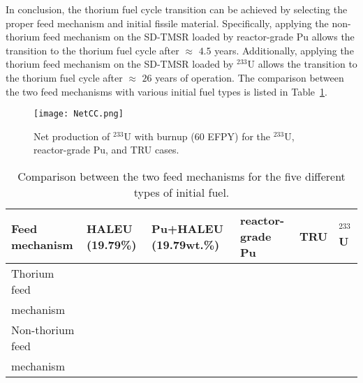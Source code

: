 In conclusion, the thorium fuel cycle transition can be achieved by selecting the 
proper feed mechanism and initial fissile material. 
Specifically, applying the non-thorium feed mechanism on 
the SD-TMSR loaded by reactor-grade Pu allows the 
transition to the thorium fuel cycle after $\approx$ 
$4.5$ years. Additionally, applying the thorium feed mechanism on 
the SD-TMSR loaded by $^{233}$U allows the 
transition to the thorium fuel cycle after $\approx$ $26$ years of operation. 
The comparison between the two feed mechanisms with various initial fuel types 
is listed in Table~\ref{tab:comp_feeds}. 

\begin{figure}
	\centering
	\texttt{[image: NetCC.png]}
	\caption{Net production of $^{233}$U with burnup (60 \gls{EFPY}) for the $^{233}$U, reactor-grade Pu, and TRU cases.}
	\label{fig:NetCC}
\end{figure}

\begin{table}  [!h]
	\begin{minipage}{\linewidth}
		\renewcommand\footnoterule{}
		\renewcommand{\thefootnote}{\alph{footnote}}
		\caption{Comparison between the two feed mechanisms for the five different 
			types of initial fuel.}
		\label{tab:comp_feeds}
		\vspace{0.1in}
		\begin{tabularx}{\textwidth}{p{} X p{} 
				p{} X X 
			}  %
			\hline
			Feed mechanism & \gls{HALEU} (19.79\%) & Pu+\gls{HALEU} (19.79wt.\%) &  
			reactor-grade Pu & \gls{TRU}& $^{233}$U \\
			\hline
			Thorium feed\\ mechanism&\xmark&\xmark&\xmark&\xmark& \cmark \\
			Non-thorium feed\\ mechanism &\xmark&\xmark&\cmark\footnotemark[1] 
			&\cmark\footnotemark[2] & \xmark\footnotemark[3] \\
			\hline
		\end{tabularx}
		\vspace{-1.5ex}%
	\end{minipage}
\end{table}
\FloatBarrier

